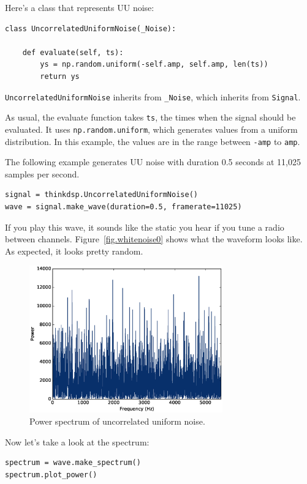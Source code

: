 \documentclass[12pt]{book}
\begin{document}
Here's a class that represents UU noise:

\begin{verbatim}
class UncorrelatedUniformNoise(_Noise):

    def evaluate(self, ts):
        ys = np.random.uniform(-self.amp, self.amp, len(ts))
        return ys
\end{verbatim}

{\tt UncorrelatedUniformNoise} inherits from \verb"_Noise", which
inherits from {\tt Signal}.

As usual, the evaluate function takes {\tt ts}, the times when the
signal should be evaluated.  It uses
{\tt np.random.uniform}, which generates values from a
uniform distribution.  In this example, the values are in
the range between {\tt -amp} to {\tt amp}.

The following example generates UU noise with duration 0.5
seconds at 11,025 samples per second.

\begin{verbatim}
signal = thinkdsp.UncorrelatedUniformNoise()
wave = signal.make_wave(duration=0.5, framerate=11025)
\end{verbatim}

If you play this wave, it sounds like the static you hear if you tune
a radio between channels.  Figure~\ref{fig.whitenoise0} shows what the
waveform looks like.  As expected, it looks pretty random.

\begin{figure}
\centerline{\includegraphics[height=2.5in]{figs/whitenoise1.eps}}
\caption{Power spectrum of uncorrelated uniform noise.}
\label{fig.whitenoise1}
\end{figure}

Now let's take a look at the spectrum:

\begin{verbatim}
spectrum = wave.make_spectrum()
spectrum.plot_power()
\end{verbatim}
\end{document}
